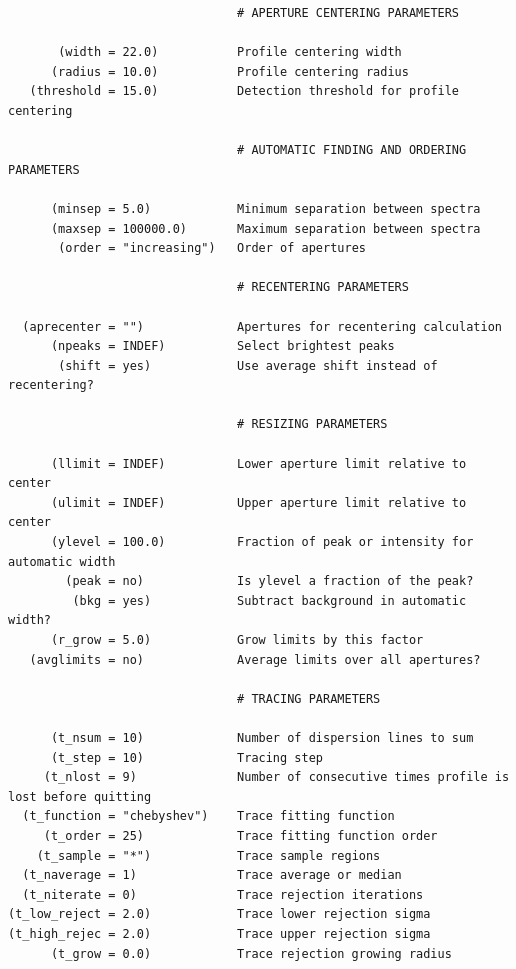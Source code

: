 \documentclass[letter,11pt,oneside]{article}
\begin{document}
\begin{verbatim}
                                # APERTURE CENTERING PARAMETERS
                                
       (width = 22.0)           Profile centering width
      (radius = 10.0)           Profile centering radius
   (threshold = 15.0)           Detection threshold for profile centering
                                
                                # AUTOMATIC FINDING AND ORDERING PARAMETERS
                                
      (minsep = 5.0)            Minimum separation between spectra
      (maxsep = 100000.0)       Maximum separation between spectra
       (order = "increasing")   Order of apertures
                                
                                # RECENTERING PARAMETERS
                                
  (aprecenter = "")             Apertures for recentering calculation
      (npeaks = INDEF)          Select brightest peaks
       (shift = yes)            Use average shift instead of recentering?
                                
                                # RESIZING PARAMETERS
                                
      (llimit = INDEF)          Lower aperture limit relative to center
      (ulimit = INDEF)          Upper aperture limit relative to center
      (ylevel = 100.0)          Fraction of peak or intensity for automatic width
        (peak = no)             Is ylevel a fraction of the peak?
         (bkg = yes)            Subtract background in automatic width?
      (r_grow = 5.0)            Grow limits by this factor
   (avglimits = no)             Average limits over all apertures?
                                
                                # TRACING PARAMETERS
                                
      (t_nsum = 10)             Number of dispersion lines to sum
      (t_step = 10)             Tracing step
     (t_nlost = 9)              Number of consecutive times profile is lost before quitting
  (t_function = "chebyshev")    Trace fitting function
     (t_order = 25)             Trace fitting function order
    (t_sample = "*")            Trace sample regions
  (t_naverage = 1)              Trace average or median
  (t_niterate = 0)              Trace rejection iterations
(t_low_reject = 2.0)            Trace lower rejection sigma
(t_high_rejec = 2.0)            Trace upper rejection sigma
      (t_grow = 0.0)            Trace rejection growing radius
                                

\end{verbatim}
\end{document}
